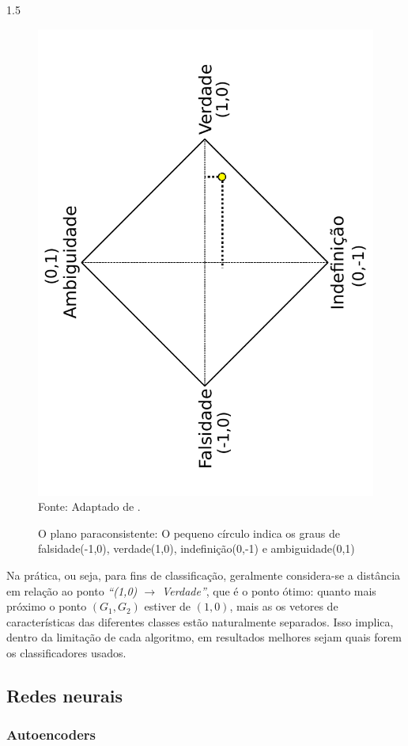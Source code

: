 \documentclass[a4paper,12pt,openright,oneside]{book}
\newenvironment{myenv}[1]
  {\begin{spacing}{#1}}
  {\end{spacing}}
\begin{document}
\begin{myenv}{1.5}
					\begin{figure}[H]
						\centering
						\caption{O plano paraconsistente: O pequeno círculo indica os graus de falsidade(-1,0), verdade(1,0), indefinição(0,-1) e ambiguidade(0,1)}
						\includegraphics[angle=-90, width=0.69\linewidth]{images/paraconsistentPlane.pdf}
						\label{fig:paraconsistentplane}
						\\Fonte: Adaptado de \cite{8588433}.
					\end{figure}
					\par Na prática, ou seja, para fins de classificação, geralmente considera-se a distância em relação ao ponto \textit{``(1,0) $\rightarrow$ Verdade''}, que é o ponto ótimo: quanto mais próximo o ponto $(G_1,G_2)$ estiver de $(1,0)$, mais as os vetores de características das diferentes classes estão naturalmente separados. Isso implica, dentro da limitação de cada algoritmo, em resultados melhores sejam quais forem os classificadores usados.
					
				\subsection{Redes neurais}
					\subsubsection{Autoencoders}
					

\end{myenv}
\end{document}
